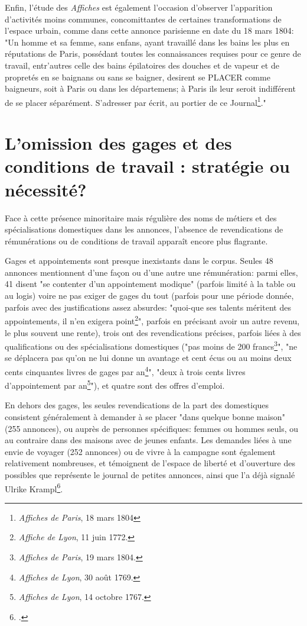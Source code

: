 {Enfin, l'étude des \textit{Affiches} est également l'occasion d'observer l'apparition d'activités moins communes, concomittantes de certaines transformations de l'espace urbain, comme dans cette annonce parisienne en date du 18 mars 1804: "Un homme et sa femme, sans enfans, ayant travaillé dans les bains les plus en réputations de Paris, possédant toutes les connaissances requises pour ce genre de travail, entr'autres celle des bains épilatoires des douches et de vapeur et de propretés en se baignans ou sans se baigner, desirent se PLACER comme baigneurs, soit à Paris ou dans les départemens; à Paris ils leur seroit indifférent de se placer séparément. S'adresser par écrit, au portier de ce Journal\footnote{\textit{Affiches de Paris}, 18 mars 1804}."


\section{L'omission des gages et des conditions de travail : stratégie ou nécessité? }

Face à cette présence minoritaire mais régulière des noms de métiers et des spécialisations domestiques dans les annonces, l'absence de revendications de rémunérations ou de conditions de travail apparaît encore plus flagrante.

Gages et appointements sont presque inexistants dans le corpus. Seules 48 annonces mentionnent d'une façon ou d'une autre une rémunération: parmi elles, 41 disent "se contenter d'un appointement modique" (parfois limité à la table ou au logis) voire ne pas exiger de gages du tout (parfois pour une période donnée, parfois avec des justifications assez absurdes: "quoi-que ses talents méritent des appointements, il n'en exigera point\footnote{\textit{Affiche de Lyon}, 11 juin 1772.}", parfois en précisant avoir un autre revenu, le plus souvent une rente), trois ont des revendications précises, parfois liées à des qualifications ou des spécialisations domestiques ("pas moins de 200 francs\footnote{\textit{Affiches de Paris}, 19 mars 1804.}", "ne se déplacera pas qu'on ne lui donne un avantage et cent écus ou au moins deux cents cinquantes livres de gages par an\footnote{\textit{Affiches de Lyon}, 30 août 1769.}", "deux à trois cents livres d'appointement par an\footnote{\textit{Affiches de Lyon}, 14 octobre 1767.}"), et quatre sont des offres d'emploi.
 
En dehors des gages, les seules revendications de la part des domestiques consistent généralement à demander à se placer "dans quelque bonne maison" (255 annonces), ou auprès de personnes spécifiques: femmes ou hommes seuls, ou au contraire dans des maisons avec de jeunes enfants. Les demandes liées à une envie de voyager (252 annonces) ou de vivre à la campagne sont également relativement nombreuses, et témoignent de l'espace de liberté et d'ouverture des possibles que représente le journal de petites annonces, ainsi que l'a déjà signalé Ulrike Krampl\footcites{kramplAdresserClercHuissier2017}. 

}
